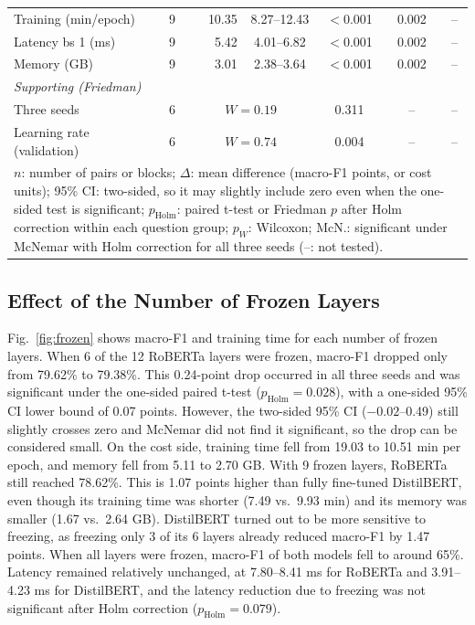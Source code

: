 \documentclass[conference]{IEEEtran}
\begin{document}
\begin{table}[t]
\begin{tabular}{lcrcccc}
Training (min/epoch) & 9 & 10.35 & 8.27--12.43 & $<$0.001 & 0.002 & -- \\
Latency bs 1 (ms) & 9 & 5.42 & 4.01--6.82 & $<$0.001 & 0.002 & -- \\
Memory (GB) & 9 & 3.01 & 2.38--3.64 & $<$0.001 & 0.002 & -- \\
\hline
\multicolumn{7}{l}{\textit{Supporting (Friedman)}} \\
Three seeds & 6 & \multicolumn{2}{c}{$W = 0.19$} & 0.311 & -- & -- \\
Learning rate (validation) & 6 & \multicolumn{2}{c}{$W = 0.74$} & 0.004 & -- & -- \\
\hline
\multicolumn{7}{p{0.95\columnwidth}}{$n$: number of pairs or blocks; $\Delta$: mean difference (macro-F1 points, or cost units); 95\% CI: two-sided, so it may slightly include zero even when the one-sided test is significant; $p_{\mathrm{Holm}}$: paired t-test or Friedman $p$ after Holm correction within each question group; $p_W$: Wilcoxon; McN.: significant under McNemar with Holm correction for all three seeds (--: not tested).}
\end{tabular}
\end{table}

\subsection{Effect of the Number of Frozen Layers}
Fig.~\ref{fig:frozen} shows macro-F1 and training time for each number of frozen layers. When 6 of the 12 RoBERTa layers were frozen, macro-F1 dropped only from 79.62\% to 79.38\%. This 0.24-point drop occurred in all three seeds and was significant under the one-sided paired t-test ($p_{\mathrm{Holm}} = 0.028$), with a one-sided 95\% CI lower bound of 0.07 points. However, the two-sided 95\% CI ($-0.02$--0.49) still slightly crosses zero and McNemar did not find it significant, so the drop can be considered small. On the cost side, training time fell from 19.03 to 10.51 min per epoch, and memory fell from 5.11 to 2.70 GB. With 9 frozen layers, RoBERTa still reached 78.62\%. This is 1.07 points higher than fully fine-tuned DistilBERT, even though its training time was shorter (7.49 vs.\ 9.93 min) and its memory was smaller (1.67 vs.\ 2.64 GB). DistilBERT turned out to be more sensitive to freezing, as freezing only 3 of its 6 layers already reduced macro-F1 by 1.47 points. When all layers were frozen, macro-F1 of both models fell to around 65\%. Latency remained relatively unchanged, at 7.80--8.41 ms for RoBERTa and 3.91--4.23 ms for DistilBERT, and the latency reduction due to freezing was not significant after Holm correction ($p_{\mathrm{Holm}} = 0.079$).
\end{document}
